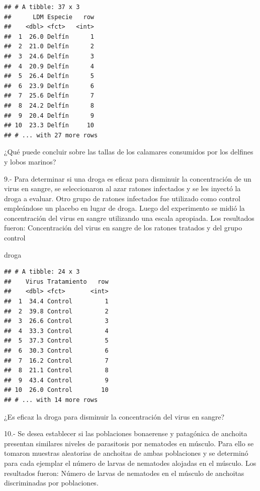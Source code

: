 \documentclass[]{book}
\newenvironment{Shaded}{\begin{snugshade}}{\end{snugshade}}
\newcommand{\NormalTok}[1]{#1}
\theoremstyle{definition}
\theoremstyle{definition}
\theoremstyle{definition}
\theoremstyle{remark}
\begin{document}
\begin{verbatim}
## # A tibble: 37 x 3
##      LDM Especie   row
##    <dbl> <fct>   <int>
##  1  26.0 Delfín      1
##  2  21.0 Delfín      2
##  3  24.6 Delfín      3
##  4  20.9 Delfín      4
##  5  26.4 Delfín      5
##  6  23.9 Delfín      6
##  7  25.6 Delfín      7
##  8  24.2 Delfín      8
##  9  20.4 Delfín      9
## 10  23.3 Delfín     10
## # ... with 27 more rows
\end{verbatim}

¿Qué puede concluir sobre las tallas de los calamares consumidos por los
delfines y lobos marinos?

9.- Para determinar si una droga es eficaz para disminuir la
concentración de un virus en sangre, se seleccionaron al azar ratones
infectados y se les inyectó la droga a evaluar. Otro grupo de ratones
infectados fue utilizado como control empleándose un placebo en lugar de
droga. Luego del experimento se midió la concentración del virus en
sangre utilizando una escala apropiada. Los resultados fueron:
Concentración del virus en sangre de los ratones tratados y del grupo
control

\begin{Shaded}
\begin{Highlighting}[]
\NormalTok{droga}
\end{Highlighting}
\end{Shaded}

\begin{verbatim}
## # A tibble: 24 x 3
##    Virus Tratamiento   row
##    <dbl> <fct>       <int>
##  1  34.4 Control         1
##  2  39.8 Control         2
##  3  26.6 Control         3
##  4  33.3 Control         4
##  5  37.3 Control         5
##  6  30.3 Control         6
##  7  16.2 Control         7
##  8  21.1 Control         8
##  9  43.4 Control         9
## 10  26.0 Control        10
## # ... with 14 more rows
\end{verbatim}

¿Es eficaz la droga para disminuir la concentración del virus en sangre?

10.- Se desea establecer si las poblaciones bonaerense y patagónica de
anchoita presentan similares niveles de parasitosis por nematodes en
músculo. Para ello se tomaron muestras aleatorias de anchoitas de ambas
poblaciones y se determinó para cada ejemplar el número de larvas de
nematodes alojadas en el músculo. Los resultados fueron: Número de
larvas de nematodes en el músculo de anchoitas discriminadas por
poblaciones.
\end{document}
